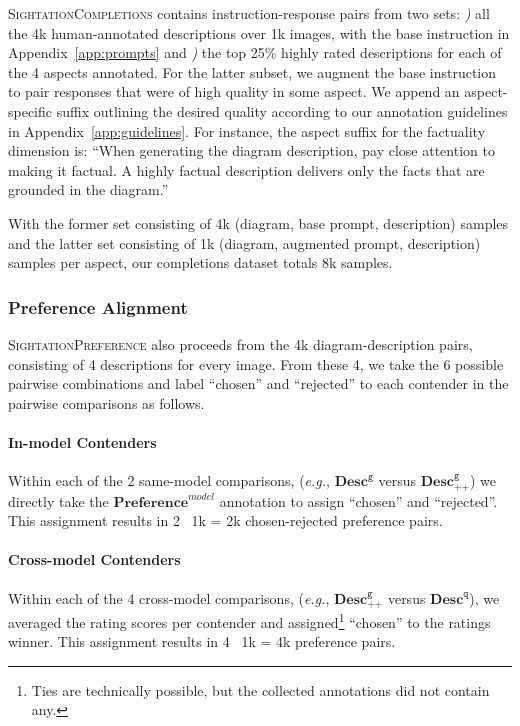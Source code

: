 \textsc{SightationCompletions} contains instruction-response pairs from two sets: \textit{)} all the 4k human-annotated descriptions over 1k images, with the base instruction in Appendix~\ref{app:prompts} and \textit{)} the top 25\% highly rated descriptions for each of the 4 aspects annotated. For the latter subset, we augment the base instruction to pair responses that were of high quality in some aspect. We append an aspect-specific suffix outlining the desired quality according to our annotation guidelines in Appendix~\ref{app:guidelines}. For instance, the aspect suffix for the factuality dimension is: ``When generating the diagram description, pay close attention to making it factual. A highly factual description delivers only the facts that are grounded in the diagram.''

With the former set consisting of 4k (diagram, base prompt, description) samples and the latter set consisting of 1k (diagram, augmented prompt, description) samples per aspect, our completions dataset totals 8k samples. 

\subsubsection{Preference Alignment} %

\textsc{SightationPreference} also proceeds from the 4k diagram-description pairs, consisting of 4 descriptions for every image. From these 4, we take the 6 possible pairwise combinations and label ``chosen'' and ``rejected'' to each contender in the pairwise comparisons as follows.
\paragraph{In-model Contenders}
Within each of the 2 same-model comparisons, (\textit{e.g.}, $\textbf{Desc}^{\texttt{g}}_{}$ versus $\textbf{Desc}^{\texttt{g}}_{\texttt{++}}$) we directly take the $\textbf{Preference}^{model}$ annotation to assign ``chosen'' and ``rejected''. This assignment results in 2 \texttimes~1k = 2k chosen-rejected preference pairs.
\paragraph{Cross-model Contenders}
Within each of the 4 cross-model comparisons, (\textit{e.g.}, $\textbf{Desc}^{\texttt{g}}_{\texttt{++}}$ versus $\textbf{Desc}^{\texttt{q}}_{}$), we averaged the rating scores per contender and assigned\footnote{Ties are technically possible, but the collected annotations did not contain any.}  ``chosen'' to the ratings winner. This assignment results in 4 \texttimes~1k = 4k preference pairs.

